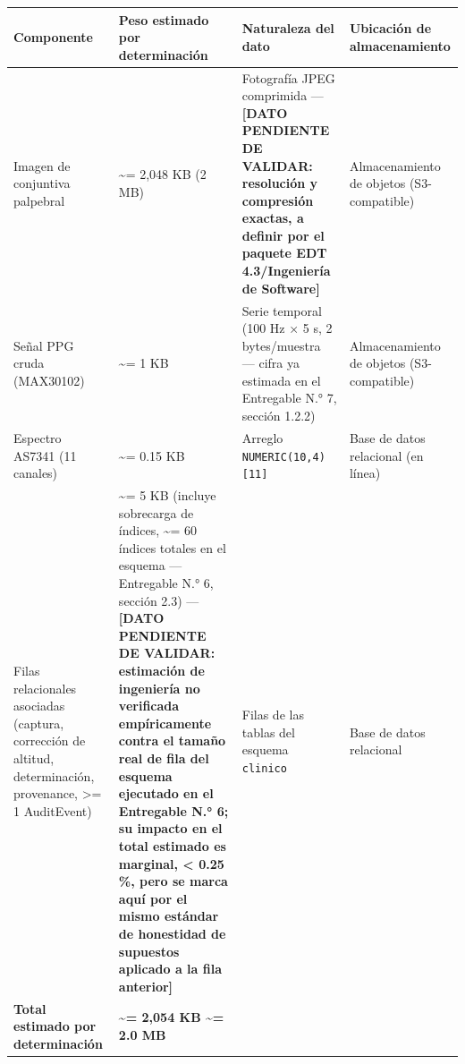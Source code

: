 \documentclass[11pt,a4paper]{article}
\begin{document}
{\small
\begin{longtable}[]{@{}
  >{\raggedright\arraybackslash}p{}
  >{\raggedright\arraybackslash}p{}
  >{\raggedright\arraybackslash}p{}
  >{\raggedright\arraybackslash}p{}@{}}
\toprule\noalign{}
\begin{minipage}[b]{\linewidth}\raggedright
Componente
\end{minipage} & \begin{minipage}[b]{\linewidth}\raggedright
Peso estimado por determinación
\end{minipage} & \begin{minipage}[b]{\linewidth}\raggedright
Naturaleza del dato
\end{minipage} & \begin{minipage}[b]{\linewidth}\raggedright
Ubicación de almacenamiento
\end{minipage} \\
\midrule\noalign{}
\endhead
\bottomrule\noalign{}
\endlastfoot
Imagen de conjuntiva palpebral & \textasciitilde= 2,048 KB (2 MB) & Fotografía JPEG comprimida --- \textbf{{[}DATO PENDIENTE DE VALIDAR: resolución y compresión exactas, a definir por el paquete EDT 4.3/Ingeniería de Software{]}} & Almacenamiento de objetos (S3-compatible) \\
Señal PPG cruda (MAX30102) & \textasciitilde= 1 KB & Serie temporal (100 Hz × 5 s, 2 bytes/muestra --- cifra ya estimada en el Entregable N.° 7, sección 1.2.2) & Almacenamiento de objetos (S3-compatible) \\
Espectro AS7341 (11 canales) & \textasciitilde= 0.15 KB & Arreglo \texttt{NUMERIC(10,4){[}11{]}} & Base de datos relacional (en línea) \\
Filas relacionales asociadas (captura, corrección de altitud, determinación, provenance, \textgreater= 1 AuditEvent) & \textasciitilde= 5 KB (incluye sobrecarga de índices, \textasciitilde= 60 índices totales en el esquema --- Entregable N.° 6, sección 2.3) --- \textbf{{[}DATO PENDIENTE DE VALIDAR: estimación de ingeniería no verificada empíricamente contra el tamaño real de fila del esquema ejecutado en el Entregable N.° 6; su impacto en el total estimado es marginal, \textless{} 0.25 \%, pero se marca aquí por el mismo estándar de honestidad de supuestos aplicado a la fila anterior{]}} & Filas de las tablas del esquema \texttt{clinico} & Base de datos relacional \\
\textbf{Total estimado por determinación} & \textbf{\textasciitilde= 2,054 KB \textasciitilde= 2.0 MB} & & \\
\end{longtable}
}
\end{document}
